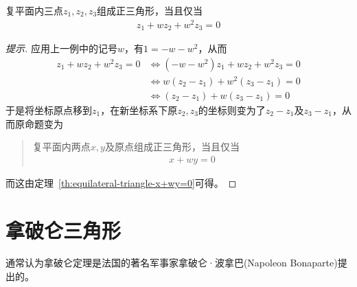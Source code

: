 \begin{theorem}\label{th:equilateral-triangle-z1+wz2+w2z3}
  复平面内三点$z_1,z_2,z_3$组成正三角形，当且仅当
  \begin{align*}
    z_1 + wz_2 + w^2z_3 = 0
  \end{align*}
\end{theorem}
\begin{proof}[提示]
  应用上一例中的记号$w$，有$1=-w-w^2$，从而
  \begin{align*}
    z_1 + wz_2 + w^2z_3 = 0 &\iff (-w-w^2)z_1 + wz_2 + w^2z_3 = 0 \\
                            & \iff w\left(z_2-z_1\right) + w^2\left(z_3-z_1\right) = 0\\
                            & \iff \left(z_2-z_1\right) + w\left(z_3-z_1\right) = 0
  \end{align*}
  于是将坐标原点移到$z_1$，在新坐标系下原$z_2,z_3$的坐标则变为了$z_2-z_1$及$z_3-z_1$，从而原命题变为
  \begin{quotation}
    复平面内两点$x,y$及原点组成正三角形，当且仅当
    \begin{align*}
      x + wy = 0
    \end{align*}
  \end{quotation}
  而这由定理~\ref{th:equilateral-triangle-x+wy=0}可得。
\end{proof}

\section{拿破仑三角形}
\label{sec:napoleon-triangle}

通常认为拿破仑定理是法国的著名军事家拿破仑·波拿巴(Napoleon Bonaparte)提出的。

